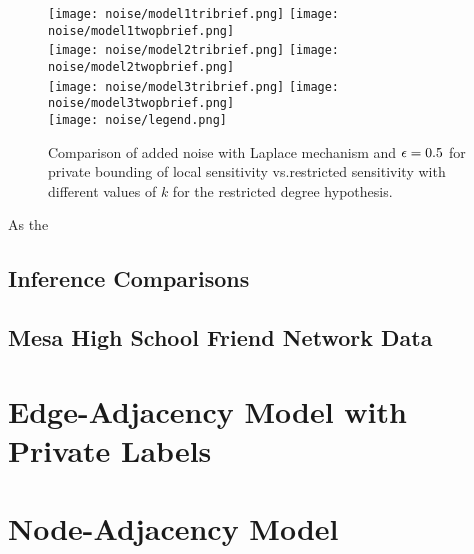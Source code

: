 \begin{figure}[!h]
	\centering
	\texttt{[image: noise/model1tribrief.png]}
	\texttt{[image: noise/model1twopbrief.png]}\\
		\texttt{[image: noise/model2tribrief.png]}
	\texttt{[image: noise/model2twopbrief.png]}\\
		\texttt{[image: noise/model3tribrief.png]}
	\texttt{[image: noise/model3twopbrief.png]}\\
	\texttt{[image: noise/legend.png]}
	
	\caption{Comparison of added noise with Laplace mechanism and $\epsilon = 0.5$ for private bounding of local sensitivity vs.restricted sensitivity with different values of $k$ for the restricted degree hypothesis.}
\end{figure}

As the 

 \subsection{Inference Comparisons}
 
 \subsection{Mesa High School Friend Network Data}
 
 \section{Edge-Adjacency Model with Private Labels}
 
 \section{Node-Adjacency Model}
 
